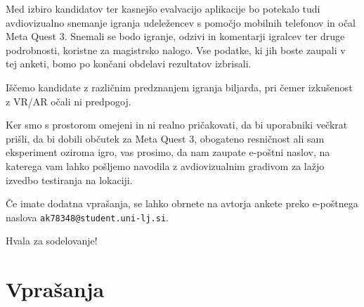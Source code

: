 \documentclass[a4paper, 12pt]{book}
\begin{document}
Med izbiro kandidatov ter kasnejšo evalvacijo aplikacije bo potekalo tudi
avdiovizualno snemanje igranja udeležencev s pomočjo mobilnih telefonov in
očal Meta Quest 3. Snemali se bodo igranje, odzivi in komentarji igralcev
ter druge podrobnosti, koristne za magistrsko nalogo. Vse podatke, ki jih
boste zaupali v tej anketi, bomo po končani obdelavi rezultatov izbrisali.

Iščemo kandidate z različnim predznanjem igranja biljarda, pri čemer
izkušenost z VR/AR očali ni predpogoj.

Ker smo s prostorom omejeni in ni realno pričakovati, da bi uporabniki
večkrat prišli, da bi dobili občutek za Meta Quest 3, obogateno resničnost
ali sam eksperiment oziroma igro, vas prosimo, da nam zaupate e-poštni
naslov, na katerega vam lahko pošljemo navodila z avdiovizualnim gradivom
za lažjo izvedbo testiranja na lokaciji.

Če imate dodatna vprašanja, se lahko obrnete na avtorja ankete preko
e-poštnega naslova \texttt{ak78348@student.uni-lj.si}.

Hvala za sodelovanje!
\newpage
\section{Vprašanja}
\end{document}
